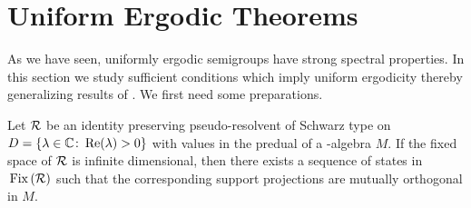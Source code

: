 \section{Uniform Ergodic Theorems}\label{sec:d4-4}
As we have seen, uniformly ergodic semigroups have strong spectral properties.
In this section we study sufficient conditions which imply uniform ergodicity thereby generalizing results of 
\textcite{groh:1984b}.
We first need some preparations.
\begin{lemma}\label{lem:d4-4.1}
Let $ \mathcal{R} $  be an identity preserving pseudo-resolvent of Schwarz type on $ D = \{\lambda \in \mathbb{C} \colon  \mathop{}\!\mathrm{Re}(\lambda) > 0\} $  with values in the predual of a \WA-algebra $ M $.
If the fixed space of\/ $ \mathcal{R} $  is infinite dimensional, then there exists a sequence of states in $ \mathop{}\mathrm{Fix}\left(\mathcal{R}\right) $  such that the corresponding support projections are mutually orthogonal in $ M $.
\end{lemma}

